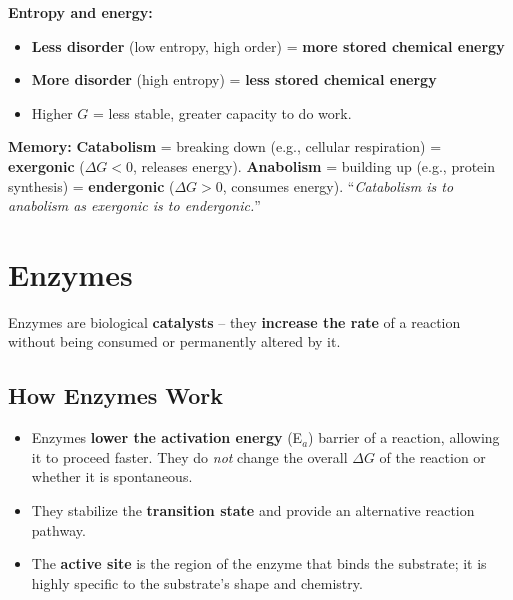 \documentclass[11pt, letterpaper]{article}
\begin{document}
\vspace{6pt}
\textbf{Entropy and energy:}
\begin{itemize}[noitemsep]
  \item \textbf{Less disorder} (low entropy, high order) = \textbf{more stored chemical energy}
  \item \textbf{More disorder} (high entropy) = \textbf{less stored chemical energy}
  \item Higher $G$ = less stable, greater capacity to do work.
\end{itemize}

\vspace{4pt}
\begin{tcolorbox}[colback=part4bg, colframe=sectionorange, arc=3pt, boxrule=1pt]
\textbf{Memory:} \textbf{Catabolism} = breaking down (e.g., cellular respiration) = \textbf{exergonic} ($\Delta G < 0$, releases energy). \textbf{Anabolism} = building up (e.g., protein synthesis) = \textbf{endergonic} ($\Delta G > 0$, consumes energy). ``\textit{Catabolism is to anabolism as exergonic is to endergonic.}''
\end{tcolorbox}

\section*{Enzymes}

Enzymes are biological \textbf{catalysts} -- they \textbf{increase the rate} of a reaction without being consumed or permanently altered by it.

\subsection*{How Enzymes Work}
\begin{itemize}[noitemsep]
  \item Enzymes \textbf{lower the activation energy} (E$_a$) barrier of a reaction, allowing it to proceed faster. They do \emph{not} change the overall $\Delta G$ of the reaction or whether it is spontaneous.
  \item They stabilize the \textbf{transition state} and provide an alternative reaction pathway.
  \item The \textbf{active site} is the region of the enzyme that binds the substrate; it is highly specific to the substrate's shape and chemistry.
\end{itemize}
\end{document}
